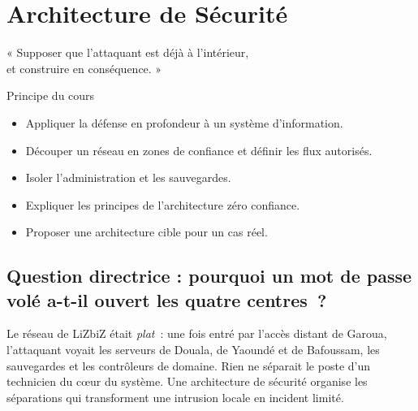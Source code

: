 
\chapter{Architecture de Sécurité}
\label{chap:architecture}

\epigraph{%
    « Supposer que l'attaquant est déjà à l'intérieur,\\
    et construire en conséquence. »%
}{Principe du cours}


\begin{boxobjectifs}
\begin{itemize}
    \item Appliquer la défense en profondeur à un système d'information.
    \item Découper un réseau en zones de confiance et définir les flux
          autorisés.
    \item Isoler l'administration et les sauvegardes.
    \item Expliquer les principes de l'architecture zéro confiance.
    \item Proposer une architecture cible pour un cas réel.
\end{itemize}
\end{boxobjectifs}

\bigskip

\section*{Question directrice : pourquoi un mot de passe volé a-t-il ouvert les quatre centres~?}

Le réseau de LiZbiZ était \emph{plat}~: une fois entré par l'accès
distant de Garoua, l'attaquant voyait les serveurs de Douala, de Yaoundé
et de Bafoussam, les sauvegardes et les contrôleurs de domaine. Rien ne
séparait le poste d'un technicien du cœur du système. Une architecture de
sécurité organise les séparations qui transforment une intrusion locale en
incident limité.

